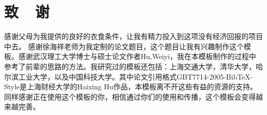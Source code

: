 \section*{致~~谢}
感谢父母为我提供的良好的衣食条件，让我有精力投入到这项没有经济回报的项目中去。
感谢徐海祥老师为我定制的论文题目，这个题目让我有兴趣制作这个模板。感谢武汉理工大学博士与硕士论文作者Hu,Weiyi，我在本模板制作的过程中参考了前辈的思路的方法。我研究过的模板还包括：上海交通大学，清华大学，哈尔滨工业大学，以及中国科技大学。其中论文引用格式GBT7714-2005-BibTeX-Style是上海财经大学的Haixing Hu作品，本模板离不开这些有益的资源的支持。同样感谢正在使用这个模板的你，相信通过你们的使用和传播，这个模板会变得越来越完善。